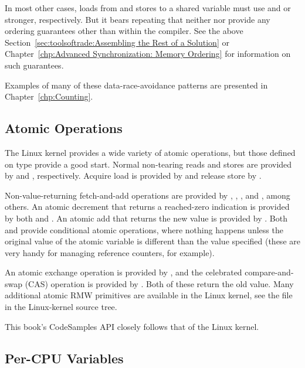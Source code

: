 In most other cases, loads from and stores to a shared variable must
use  and  or stronger, respectively.
But it bears repeating that neither  nor 
provide any ordering guarantees other than within the compiler.
See the above
Section~\ref{sec:toolsoftrade:Assembling the Rest of a Solution} or
Chapter~\ref{chp:Advanced Synchronization: Memory Ordering}
for information on such guarantees.

Examples of many of these data-race-avoidance patterns are presented in
Chapter~\ref{chp:Counting}.

\subsection{Atomic Operations}
\label{sec:toolsoftrade:Atomic Operations}

%
The Linux kernel provides a wide variety of atomic operations, but
those defined on type  provide a good start.
Normal non-tearing reads and stores are provided by
 and , respectively.
Acquire load is provided by  and release
store by .

Non-value-returning fetch-and-add operations are provided by
, , , and
, among others.
An atomic decrement that returns a reached-zero indication is provided
by both  and .
An atomic add that returns the new value is provided by
.
Both  and  provide
conditional atomic operations, where nothing happens unless the
original value of the atomic variable is different than the value
specified (these are very handy for managing reference counters, for
example).

An atomic exchange operation is provided by , and
the celebrated compare-and-swap (CAS) operation is provided by
.
Both of these return the old value.
Many additional atomic RMW primitives are available in the Linux kernel,
see the  file in the Linux-kernel
source tree.

This book's CodeSamples API closely follows that of the Linux kernel.

\subsection{Per-CPU Variables}
\label{sec:toolsoftrade:Per-CPU Variables}

